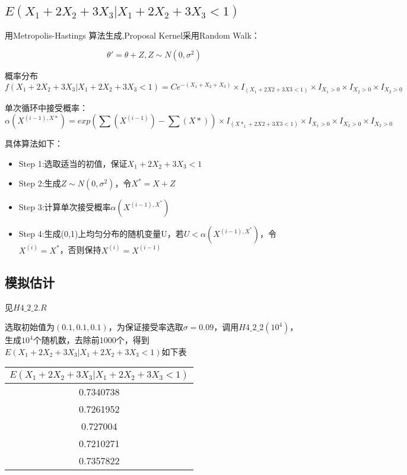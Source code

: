 \documentclass{ctexart}
\begin{document}
\subsection{\(E(X_1+2X_2+3X_3 |X_1+2X_2+3X_3 <1)\)}

用Metropolis-Hastings 算法生成,Proposal Kernel采用Random Walk：

\[
\theta'=\theta+Z,Z\sim N(0,\sigma^2)
\]

概率分布
\[f(X_1+2X_2+3X_3 |X_1+2X_2+3X_3 <1)=Ce^{-(X_1+X_2+X_3)}\times I_{(X_1+2X2+3X3 <1)}\times I_{X_1>0}\times I_{X_2>0}\times I_{X_2>0}\]

单次循环中接受概率：
\[\alpha(X^{(i-1),X*}) = exp(\sum(X^{(i-1)})-\sum(X*)) \times I_{(X*_1+2X2+3X3 <1)}\times I_{X_1>0}\times I_{X_2>0}\times I_{X_2>0}\]

具体算法如下：
\begin{itemize} 
\item Step 1:选取适当的初值，保证\(X_1+2X_2+3X_3 <1\)
\item Step 2:生成\(Z \sim N(0,\sigma^2)\)，令\(X^*=X+Z\)
\item Step 3:计算单次接受概率\(\alpha(X^{(i-1),X^*})\)
\item Step 4:生成(0,1)上均匀分布的随机变量U，若\(U<\alpha(X^{(i-1),X^*})\)，令\(X^{(i)}=X^*\)，否则保持\(X^{(i)}=X^{(i-1)}\)
\end{itemize}

\subsection{模拟估计}

见\(H4\_2\_2.R\)

选取初始值为\((0.1,0.1,0.1)\)，为保证接受率选取\(\sigma=0.09\)，调用\(H4\_2\_2(10^4)\)，生成\(10^4\)个随机数，去除前1000个，得到\(E(X_1+2X_2+3X_3 |X_1+2X_2+3X_3 <1)\)如下表
\begin{table}[h]
\centering
\begin{tabular}{| c | }
          \hline
          \bf $E(X_1+2X_2+3X_3 | X_1+2X_2+3X_3 <1)$  \\
          \hline
0.7340738 \\
          \hline
 0.7261952\\
          \hline
   0.727004\\
          \hline
0.7210271\\
\hline
0.7357822\\
\hline
\end{tabular}
\end{table}
\end{document}
